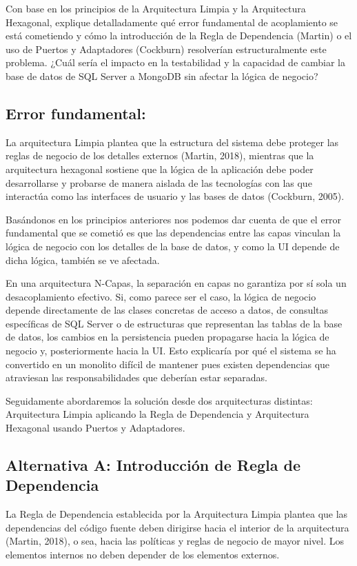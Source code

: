 \documentclass[12pt, a4paper]{article}
\begin{document}
        Con base en los principios de la Arquitectura Limpia y la Arquitectura Hexagonal, explique detalladamente qué error fundamental de acoplamiento se está cometiendo y cómo la introducción de la Regla de Dependencia (Martin) o el uso de Puertos y Adaptadores (Cockburn) resolverían estructuralmente este problema. ¿Cuál sería el impacto en la testabilidad y la capacidad de cambiar la base de datos de SQL Server a MongoDB sin afectar la lógica de negocio?

        \subsection{Error fundamental:}
        La arquitectura Limpia plantea que la estructura del sistema debe proteger las reglas de negocio de los detalles externos (Martin, 2018), mientras que la arquitectura hexagonal sostiene que la lógica de la aplicación debe poder desarrollarse y probarse de manera aislada de las tecnologías con las que interactúa como las interfaces de usuario y las bases de datos (Cockburn, 2005).

        Basándonos en los principios anteriores nos podemos dar cuenta de que el error fundamental que se cometió es que las dependencias entre las capas vinculan la lógica de negocio con los detalles de la base de datos, y como la UI depende de dicha lógica, también se ve afectada. 

        En una arquitectura N-Capas, la separación en capas no garantiza por sí sola un desacoplamiento efectivo. Si, como parece ser el caso, la lógica de negocio depende directamente de las clases concretas de acceso a datos, de consultas específicas de SQL Server o de estructuras que representan las tablas de la base de datos, los cambios en la persistencia pueden propagarse hacia la lógica de negocio y, posteriormente hacia la UI. Esto explicaría por qué el sistema se ha convertido en un monolito difícil de mantener pues existen dependencias que atraviesan las responsabilidades que deberían estar separadas.

        Seguidamente abordaremos la solución desde dos arquitecturas distintas: Arquitectura Limpia aplicando la Regla de Dependencia y Arquitectura Hexagonal usando Puertos y Adaptadores.

        \subsection{Alternativa A: Introducción de Regla de Dependencia}
        La Regla de Dependencia establecida por la Arquitectura Limpia plantea que las dependencias del código fuente deben dirigirse hacia el interior de la arquitectura (Martin, 2018), o sea, hacia las políticas y reglas de negocio de mayor nivel. Los elementos internos no deben depender de los elementos externos.
\end{document}
